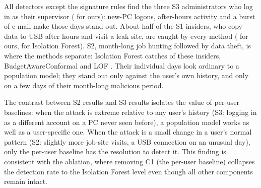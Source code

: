 All detectors except the signature rules find the three S3 administrators who log in as their
supervisor (\DROursSThree{} for ours): new-PC logons, after-hours activity and a burst of e-mail make
those days stand out. About half of the S1 insiders, who copy data to USB after hours and visit a leak
site, are caught by every method (\DROursSOne{} for ours, \DRIFSOne{} for Isolation Forest). S2,
month-long job hunting followed by data theft, is where the methods separate: Isolation Forest
catches \DRIFSTwo{} of these insiders, BudgetAwareConformal \DROursSTwo{} and LOF \DRLOFSTwo. Their
individual days look ordinary to a population model; they stand out only against the user's own
history, and only on a few days of their month-long malicious period.

The contrast between S2 results and S3 results isolates the value of per-user baselines: when the
attack is extreme relative to any user's history (S3: logging in as a different account on a PC
never seen before), a population model works as well as a user-specific one. When the attack
is a small change in a user's normal pattern (S2: slightly more job-site visits, a USB connection
on an unusual day), only the per-user baseline has the resolution to detect it. This finding is
consistent with the ablation, where removing C1 (the per-user baseline) collapses the detection
rate to the Isolation Forest level even though all other components remain intact.
